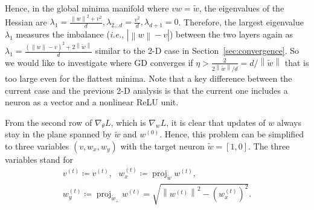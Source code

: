 \documentclass{article}
\theoremstyle{plain}
\theoremstyle{remark}
\DeclareMathOperator{\proj}{proj}
\newcommand{\norm}[1]{\left\lVert#1\right\rVert}
\begin{document}
Hence, in the global minima manifold where $vw=\tilde{w}$, the eigenvalues of the Hessian are $\lambda_1 = \frac{\norm{w}^2 + v^2}{d}, \lambda_{2\dots d}=\frac{v^2}{d}, \lambda_{d+1}=0$. Therefore, the largest eigenvalue $\lambda_1$ measures the imbalance (\textit{i.e.}, $|\norm{w}-v|$)  between the two layers again as $\lambda_1=\frac{(\norm{w}-v)^2+2\norm{\tilde{w}}}{d}$ similar to the 2-D case in Section~\ref{sec:convergence}. So we would like to investigate where GD converges if $\eta>\frac{2}{2\norm{\tilde{w}}/d}=d/\norm{\tilde{w}}$ that is too large even for the flattest minima. Note that a key difference between the current case and the previous 2-D analysis is that the current one includes a neuron as a vector and a nonlinear ReLU unit.

From the second row of $\nabla_\theta L$, which is $\nabla_w L$, it is clear that updates of $w$ always stay in the plane spanned by $\tilde{w}$ and $w^{(0)}$. Hence, this problem can be simplified to three variables $(v, w_x, w_y)$ with the target neuron $\tilde{w}=[1,0]$. The three variables stand for
\begin{gather*}
    v^{(t)}\coloneqq v^{(t)},~~~ w_x^{(t)}\coloneqq \proj_{\tilde{w}} w^{(t)}, \\
    w_y^{(t)}\coloneqq \proj_{\tilde{w}_\perp} w^{(t)} = \sqrt{\norm{w^{(t)}}^2-(w_x^{(t)})^2}.
\end{gather*}

\end{document}

